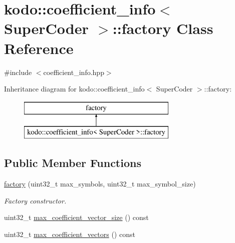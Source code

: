 \hypertarget{classkodo_1_1coefficient__info_1_1factory}{\section{kodo\-:\-:coefficient\-\_\-info$<$ Super\-Coder $>$\-:\-:factory Class Reference}
\label{classkodo_1_1coefficient__info_1_1factory}
}


{\ttfamily \#include $<$coefficient\-\_\-info.\-hpp$>$}

Inheritance diagram for kodo\-:\-:coefficient\-\_\-info$<$ Super\-Coder $>$\-:\-:factory\-:\begin{figure}[H]
\begin{center}
\leavevmode
\includegraphics[height=2.000000cm]{classkodo_1_1coefficient__info_1_1factory}
\end{center}
\end{figure}
\subsection*{Public Member Functions}
\begin{DoxyCompactItemize}
\item 
\hyperlink{classkodo_1_1coefficient__info_1_1factory_a5ac5c9c35eecd7f3ff163bec9e9c97a9}{factory} (uint32\-\_\-t max\-\_\-symbols, uint32\-\_\-t max\-\_\-symbol\-\_\-size)
\begin{DoxyCompactList}\small\item\em Factory constructor. \end{DoxyCompactList}\item 
uint32\-\_\-t \hyperlink{classkodo_1_1coefficient__info_1_1factory_a8ca94bb3235422750289cb802ac834cb}{max\-\_\-coefficient\-\_\-vector\-\_\-size} () const 
\begin{DoxyCompactList}\small\item\em \end{DoxyCompactList}\item 
uint32\-\_\-t \hyperlink{classkodo_1_1coefficient__info_1_1factory_af0315cd6fcc3225d5f3f6bfee1262d55}{max\-\_\-coefficient\-\_\-vectors} () const 
\begin{DoxyCompactList}\small\item\em \end{DoxyCompactList}\end{DoxyCompactItemize}



